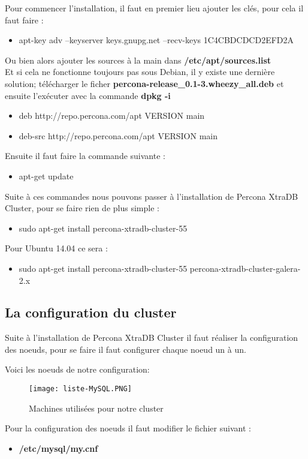 \documentclass[a4paper,10pt,one side,titlepage]{report}
\begin{document}
Pour commencer l'installation, il faut en premier lieu ajouter les clés, pour cela il faut faire :
\begin{itemize}
\item apt-key adv --keyserver keys.gnupg.net --recv-keys 1C4CBDCDCD2EFD2A
\end{itemize}
Ou bien alors ajouter les sources à la main dans \textbf{/etc/apt/sources.list}\\
Et si cela ne fonctionne toujours pas sous Debian, il y existe une dernière solution; télécharger le ficher \textbf{percona-release\_0.1-3.wheezy\_all.deb} et 
ensuite l'exécuter avec la commande \textbf{dpkg -i}
\begin{itemize}
\item deb http://repo.percona.com/apt VERSION main
\item deb-src http://repo.percona.com/apt VERSION main
\end{itemize}
Ensuite il faut faire la commande suivante :
\begin{itemize}
\item apt-get update
\end{itemize}
Suite à ces commandes nous pouvons passer à l'installation de Percona XtraDB 
Cluster, pour se faire rien de plus simple :
\begin{itemize}
\item sudo apt-get install percona-xtradb-cluster-55
\end{itemize}
Pour Ubuntu 14.04 ce sera :
\begin{itemize}
\item sudo apt-get install percona-xtradb-cluster-55 percona-xtradb-cluster-galera-2.x
\end{itemize}

\subsection{La configuration du cluster}
Suite à l'installation de Percona XtraDB Cluster il faut réaliser la configuration 
des noeuds, pour se faire il faut configurer chaque noeud un à un.

Voici les noeuds de notre configuration:

\begin{figure}[h]
    \centering
\texttt{[image: liste-MySQL.PNG]} 
    \caption{Machines utilisées pour notre cluster}
    \label{fig:machinecluster}
\end{figure}

Pour la configuration des noeuds il faut modifier le fichier suivant :
\begin{itemize}
\item \textbf{/etc/mysql/my.cnf}
\end{itemize}
\end{document}
